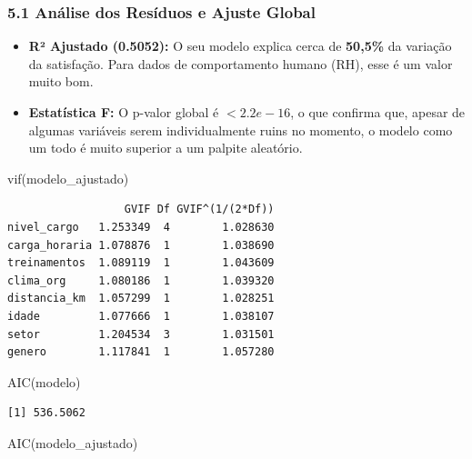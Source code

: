 \documentclass[
  letterpaper,
  DIV=11,
  numbers=noendperiod]{scrartcl}
\newenvironment{Shaded}{\begin{snugshade}}{\end{snugshade}}
\newcommand{\FunctionTok}[1]{\textcolor[rgb]{0.28,0.35,0.67}{#1}}
\newcommand{\NormalTok}[1]{\textcolor[rgb]{0.00,0.23,0.31}{#1}}
\begin{document}
\subsubsection{\texorpdfstring{\textbf{5.1 Análise dos Resíduos e Ajuste
Global}}{5.1 Análise dos Resíduos e Ajuste Global}}\label{anuxe1lise-dos-resuxedduos-e-ajuste-global}

\begin{itemize}
\item
  \textbf{R² Ajustado (0.5052):} O seu modelo explica cerca de
  \textbf{50,5\%} da variação da satisfação. Para dados de comportamento
  humano (RH), esse é um valor muito bom.
\item
  \textbf{Estatística F:} O p-valor global é \(< 2.2e-16\), o que
  confirma que, apesar de algumas variáveis serem individualmente ruins
  no momento, o modelo como um todo é muito superior a um palpite
  aleatório.
\end{itemize}

\begin{Shaded}
\begin{Highlighting}[]
\FunctionTok{vif}\NormalTok{(modelo\_ajustado)}
\end{Highlighting}
\end{Shaded}

\begin{verbatim}
                  GVIF Df GVIF^(1/(2*Df))
nivel_cargo   1.253349  4        1.028630
carga_horaria 1.078876  1        1.038690
treinamentos  1.089119  1        1.043609
clima_org     1.080186  1        1.039320
distancia_km  1.057299  1        1.028251
idade         1.077666  1        1.038107
setor         1.204534  3        1.031501
genero        1.117841  1        1.057280
\end{verbatim}

\begin{Shaded}
\begin{Highlighting}[]
\FunctionTok{AIC}\NormalTok{(modelo)}
\end{Highlighting}
\end{Shaded}

\begin{verbatim}
[1] 536.5062
\end{verbatim}

\begin{Shaded}
\begin{Highlighting}[]
\FunctionTok{AIC}\NormalTok{(modelo\_ajustado)}
\end{Highlighting}
\end{Shaded}
\end{document}
